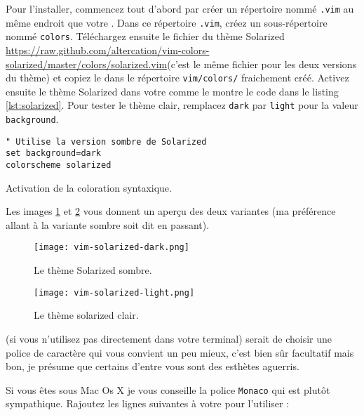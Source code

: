 Pour l'installer, commencez tout d'abord par créer un répertoire nommé \Verb|.vim| au même endroit que votre \vimrc{}. Dans ce répertoire \Verb|.vim|, créez un sous-répertoire nommé \Verb|colors|. Téléchargez ensuite le fichier du thème Solarized \url{https://raw.github.com/altercation/vim-colors-solarized/master/colors/solarized.vim}(c'est le même fichier pour les deux versions du thème) et copiez le dans le répertoire \Verb|vim/colors/| fraichement créé. Activez ensuite le thème Solarized dans votre \vimrc comme le montre le code dans le listing \ref{lst:solarized}. Pour tester le thème clair, remplacez \Verb|dark| par \Verb|light| pour la valeur \Verb|background|.

\begin{listing}[H]
\begin{verbatim}
" Utilise la version sombre de Solarized
set background=dark
colorscheme solarized
\end{verbatim}
  \caption{Activation de la coloration syntaxique.}
  \label{lst:solarized}
\end{listing}

Les images \ref{fig:vim-solarized-dark} et \ref{fig:vim-solarized-light} vous donnent un aperçu des deux variantes (ma préférence allant à la variante sombre soit dit en passant).

\begin{figure}%
  \texttt{[image: vim-solarized-dark.png]}
  \caption{Le thème Solarized sombre.}
  \label{fig:vim-solarized-dark}
\end{figure}

\begin{figure}%
  \texttt{[image: vim-solarized-light.png]}
  \caption{Le thème solarized clair.}
  \label{fig:vim-solarized-light}
\end{figure}

 (si vous n'utilisez pas \vim directement dans votre terminal) serait de choisir une police de caractère qui vous convient un peu mieux, c'est bien sûr facultatif mais bon, je présume que certains d'entre vous sont des esthètes aguerris.

Si vous êtes sous Mac Os X je vous conseille la police \Verb|Monaco| qui est plutôt sympathique. Rajoutez les lignes suivantes à votre \vimrc pour l'utiliser :

